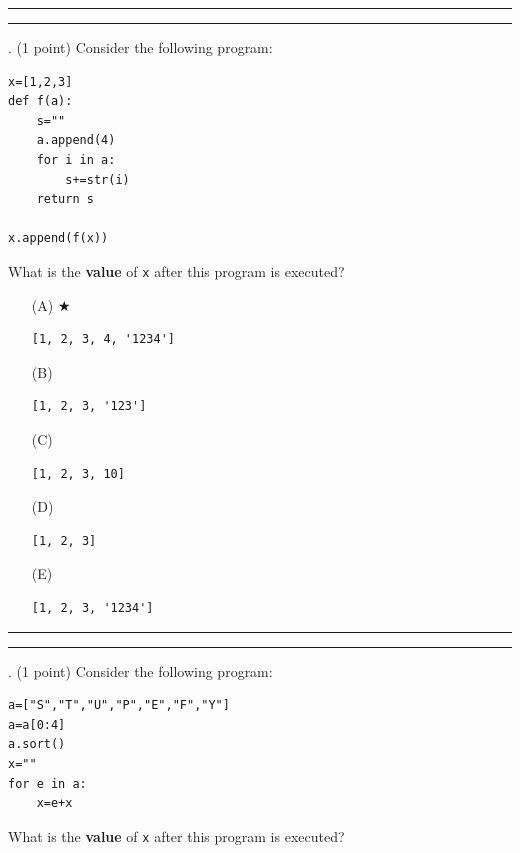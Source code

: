 \documentclass{article}
\begin{document}
\vspace*{2em}
\hrule
\vspace{2em}

\vspace{2em}
\hrule height 2pt


\newpage
{}. (1 point)
Consider the following program:
\begin{verbatim}
x=[1,2,3]
def f(a):
    s=""
    a.append(4)
    for i in a:
        s+=str(i)
    return s

x.append(f(x))
\end{verbatim}
What is the \textbf{value} of \texttt{x} after this program is executed?


\begin{enumerate}
\item[(A)] $\bigstar$ 
\begin{verbatim}[1, 2, 3, 4, '1234']\end{verbatim}

\item[(B)]
\begin{verbatim}[1, 2, 3, '123']\end{verbatim}

\item[(C)]
\begin{verbatim}[1, 2, 3, 10]\end{verbatim}

\item[(D)]
\begin{verbatim}[1, 2, 3]\end{verbatim}

\item[(E)]
\begin{verbatim}[1, 2, 3, '1234']\end{verbatim}

\end{enumerate}

\vspace*{2em}
\hrule
\vspace{2em}

\vspace{2em}
\hrule height 2pt


\newpage
{}. (1 point)
Consider the following program:
\begin{verbatim}
a=["S","T","U","P","E","F","Y"]
a=a[0:4]
a.sort()
x=""
for e in a:
    x=e+x
\end{verbatim}
What is the \textbf{value} of \texttt{x} after this program is executed?
\end{document}

